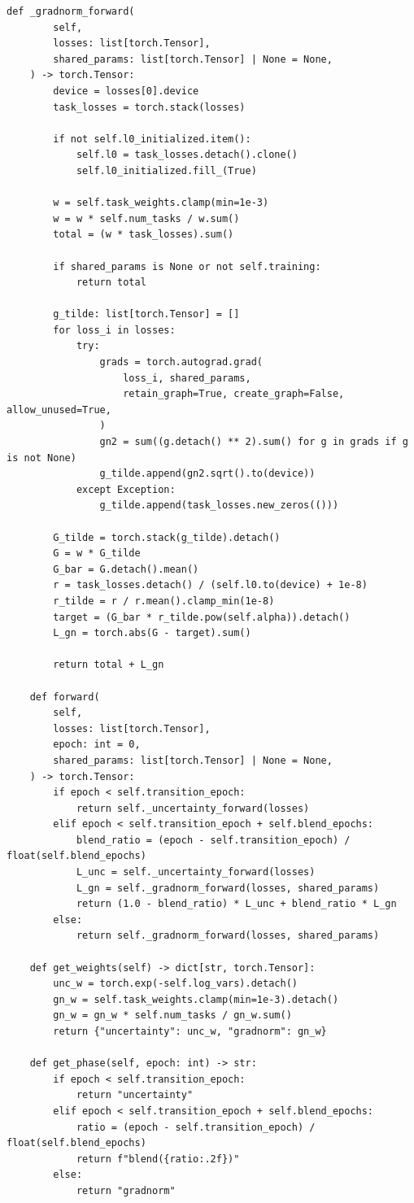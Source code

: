 \documentclass[11pt,a4paper]{article}
\begin{document}
\begin{lstlisting}[style=pythonstyle]
    def _gradnorm_forward(
        self,
        losses: list[torch.Tensor],
        shared_params: list[torch.Tensor] | None = None,
    ) -> torch.Tensor:
        device = losses[0].device
        task_losses = torch.stack(losses)

        if not self.l0_initialized.item():
            self.l0 = task_losses.detach().clone()
            self.l0_initialized.fill_(True)

        w = self.task_weights.clamp(min=1e-3)
        w = w * self.num_tasks / w.sum()
        total = (w * task_losses).sum()

        if shared_params is None or not self.training:
            return total

        g_tilde: list[torch.Tensor] = []
        for loss_i in losses:
            try:
                grads = torch.autograd.grad(
                    loss_i, shared_params,
                    retain_graph=True, create_graph=False, allow_unused=True,
                )
                gn2 = sum((g.detach() ** 2).sum() for g in grads if g is not None)
                g_tilde.append(gn2.sqrt().to(device))
            except Exception:
                g_tilde.append(task_losses.new_zeros(()))

        G_tilde = torch.stack(g_tilde).detach()
        G = w * G_tilde
        G_bar = G.detach().mean()
        r = task_losses.detach() / (self.l0.to(device) + 1e-8)
        r_tilde = r / r.mean().clamp_min(1e-8)
        target = (G_bar * r_tilde.pow(self.alpha)).detach()
        L_gn = torch.abs(G - target).sum()

        return total + L_gn

    def forward(
        self,
        losses: list[torch.Tensor],
        epoch: int = 0,
        shared_params: list[torch.Tensor] | None = None,
    ) -> torch.Tensor:
        if epoch < self.transition_epoch:
            return self._uncertainty_forward(losses)
        elif epoch < self.transition_epoch + self.blend_epochs:
            blend_ratio = (epoch - self.transition_epoch) / float(self.blend_epochs)
            L_unc = self._uncertainty_forward(losses)
            L_gn = self._gradnorm_forward(losses, shared_params)
            return (1.0 - blend_ratio) * L_unc + blend_ratio * L_gn
        else:
            return self._gradnorm_forward(losses, shared_params)

    def get_weights(self) -> dict[str, torch.Tensor]:
        unc_w = torch.exp(-self.log_vars).detach()
        gn_w = self.task_weights.clamp(min=1e-3).detach()
        gn_w = gn_w * self.num_tasks / gn_w.sum()
        return {"uncertainty": unc_w, "gradnorm": gn_w}

    def get_phase(self, epoch: int) -> str:
        if epoch < self.transition_epoch:
            return "uncertainty"
        elif epoch < self.transition_epoch + self.blend_epochs:
            ratio = (epoch - self.transition_epoch) / float(self.blend_epochs)
            return f"blend({ratio:.2f})"
        else:
            return "gradnorm"
\end{lstlisting}
\end{document}
